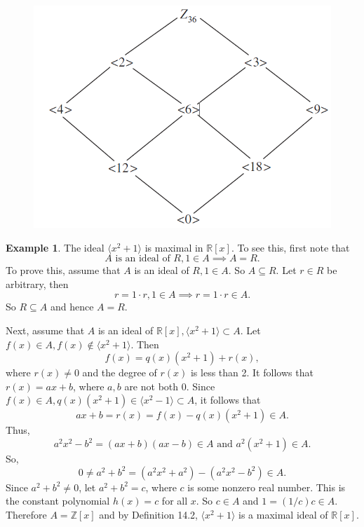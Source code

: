 \documentclass{article}
\theoremstyle{definition}
\newtheorem{example}{Example}[section]
\begin{document}
\begin{figure}[!htbp]
    \centering
    \includegraphics[width=0.65\linewidth]{figures/lattice-of-ideals-Z_36.png}
    \caption{}
    \label{lattice-of-ideals-Z_36}
\end{figure}

\begin{example}
    The ideal $\langle x^2+1 \rangle$ is maximal in $\mathbb{R}[x]$. To see this, first note that 
    \begin{equation*}
        A \text{ is an ideal of } R, 1\in A \implies A=R.
    \end{equation*}
    To prove this, assume that $A$ is an ideal of $R, 1\in A$. So $A \subseteq R$. Let $r\in R$ be arbitrary, then
    \begin{equation*}
        r=1\cdot r, 1\in A \implies r=1\cdot r\in A.
    \end{equation*}
    So $R \subseteq A$ and hence $A=R$.
    
    Next, assume that $A$ is an ideal of $\mathbb{R}[x], \langle x^2+1 \rangle \subset A$. Let $f(x)\in A, f(x) \notin \langle x^2+1 \rangle$. Then
    \begin{equation*}
        f(x)=q(x)(x^2+1)+r(x),
    \end{equation*}
    where $r(x)\neq0$ and the degree of $r(x)$ is less than 2. It follows that $r(x)=ax+b$, where $a,b$ are not both 0. Since $f(x)\in A, q(x)(x^2+1)\in \langle x^2-1 \rangle \subset A$, it follows that
    \begin{equation*}
        ax+b=r(x)=f(x)-q(x)(x^2+1)\in A.
    \end{equation*}
    Thus,
    \begin{equation*}
        a^2x^2-b^2=(ax+b)(ax-b)\in A \text{ and } a^2(x^2+1)\in A.
    \end{equation*}
    So,
    \begin{equation*}
        0 \neq a^2+b^2 = (a^2x^2+a^2)-(a^2x^2-b^2)\in A.
    \end{equation*}
    Since $a^2+b^2\neq0$, let $a^2+b^2=c$, where $c$ is some nonzero real number. This is the constant polynomial $h(x)=c$ for all $x$. So $c\in A$ and $1=(1/c)c\in A$. Therefore $A=\mathbb{Z}[x]$ and by Definition 14.2, $\langle x^2+1 \rangle$ is a maximal ideal of $\mathbb{R}[x]$.
\end{example}
\end{document}
